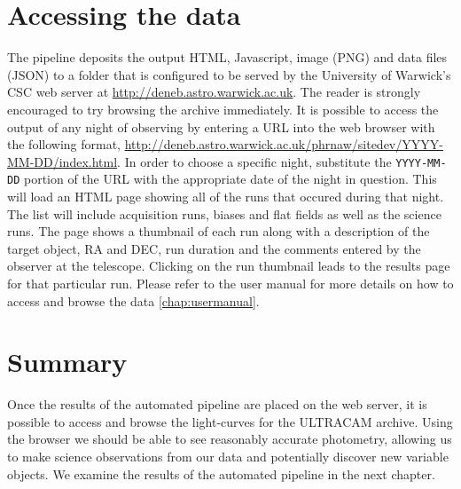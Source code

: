 \section{Accessing the data}
The pipeline deposits the output HTML, Javascript, image (PNG) and data files (JSON) to a folder that is configured to be served by the University of Warwick's CSC web server at \url{http://deneb.astro.warwick.ac.uk}. The reader is strongly encouraged to try browsing the archive immediately. It is possible to access the output of any night of observing by entering a URL into the web browser with the following format, \url{http://deneb.astro.warwick.ac.uk/phrnaw/sitedev/YYYY-MM-DD/index.html}. In order to choose a specific night, substitute the \texttt{YYYY-MM-DD} portion of the URL with the appropriate date of the night in question. This will load an HTML page showing all of the runs that occured during that night. The list will include acquisition runs, biases and flat fields as well as the science runs. The page shows a thumbnail of each run along with a description of the target object, RA and DEC, run duration and the comments entered by the observer at the telescope. Clicking on the run thumbnail leads to the results page for that particular run. Please refer to the user manual for more details on how to access and browse the data \ref{chap:usermanual}. 

\section{Summary}
Once the results of the automated pipeline are placed on the web server, it is  possible to access and browse the light-curves for the ULTRACAM archive. Using the browser we should be able to see reasonably accurate photometry, allowing us to make science observations from our data and potentially discover new variable objects. We examine the results of the automated pipeline in the next chapter. 

